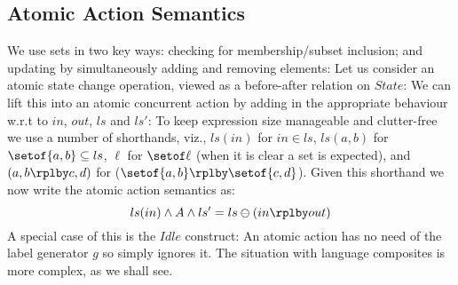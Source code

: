 \subsection{Atomic Action Semantics}

We use sets in two key ways:
checking for membership/subset inclusion;
and updating by simultaneously adding and removing elements:
Let us consider an atomic state change operation,
viewed as a before-after relation on $State$:
We can lift this into an atomic concurrent action by adding in
the appropriate behaviour w.r.t to $in$, $out$, $ls$ and $ls'$:
\noindent
To keep expression size manageable and clutter-free
we use a number of shorthands,
viz., $ls(in)$ for $ in \in ls$, $ls(a,b)$ for $\setof{a,b}\subseteq ls$,
$\ell$ for $\setof\ell$ (when it is clear a set is expected),
and $(a,b \rplby c,d)$ for ($\setof{a,b}\rplby \setof{c,d}$).
Given this shorthand we now write the atomic action semantics as:
\begin{equation*}
ls(in) \land A \land ls'=ls\ominus(in \rplby out)
\end{equation*}
A special case of this is the $Idle$ construct:
An atomic action has no need of the label generator $g$
so simply ignores it.
The situation with language composites is more complex, as we shall see.

